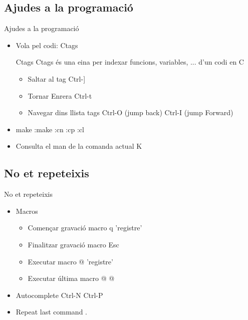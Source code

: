 \documentclass{beamer}
\begin{document}
    \subsection{Ajudes a la programació}
    \begin{frame}{Ajudes a la programació}
        \begin{itemize}
            \item Vola pel codi: \alert{Ctags}
                \begin{block}{Ctags}
                    Ctags és una eina per indexar funcions, variables, ... d'un
                    codi en C
                \end{block}
                \begin{itemize}
                    \item Saltar al tag \alert{Ctrl-]}
                    \item Tornar Enrera \alert{Ctrl-t}
                    \item Navegar dins llista tags \alert{Ctrl-O (jump back) Ctrl-I (jump Forward)}
                \end{itemize}
            \item make \alert{:make :cn :cp :cl}
            \item Consulta el man de la comanda actual \alert{K}
        \end{itemize}
    \end{frame}

    \subsection{No et repeteixis}
    \begin{frame}{No et repeteixis}
        \begin{itemize}
            \item Macros
                \begin{itemize}
                    \item Començar gravació macro \alert{q 'registre'}
                    \item Finalitzar gravació macro \alert{Esc}
                    \item Executar macro \alert{@ 'registre'}
                    \item Executar última macro \alert{@ @}
                \end{itemize}
            \item Autocomplete \alert{Ctrl-N  Ctrl-P}
            \item Repeat last command \alert{.}
        \end{itemize}
    \end{frame}
\end{document}
